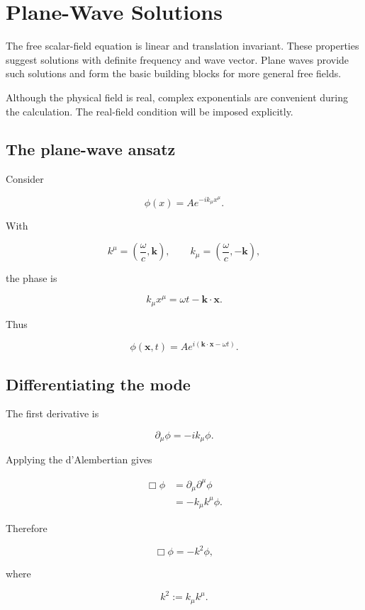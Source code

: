 \section{Plane-Wave Solutions}
\label{sec:plane_wave_solutions}

The free scalar-field equation is linear and translation invariant. These properties suggest solutions with definite frequency and wave vector. Plane waves provide such solutions and form the basic building blocks for more general free fields.

Although the physical field is real, complex exponentials are convenient during the calculation. The real-field condition will be imposed explicitly.

\subsection{The plane-wave ansatz}

Consider

\[
\boxed{
\phi(x)=A e^{-ik_{\mu}x^{\mu}}
}.
\]

With

\[
k^{\mu}
=
\left(
\frac{\omega}{c},
\mathbf{k}
\right),
\qquad
k_{\mu}
=
\left(
\frac{\omega}{c},
-\mathbf{k}
\right),
\]

the phase is

\[
k_{\mu}x^{\mu}
=
\omega t-
\mathbf{k}\cdot\mathbf{x}.
\]

Thus

\[
\phi(\mathbf{x},t)
=
A e^{i(\mathbf{k}\cdot\mathbf{x}-\omega t)}.
\]

\subsection{Differentiating the mode}

The first derivative is

\[
\partial_{\mu}\phi
=
-ik_{\mu}\phi.
\]

Applying the d'Alembertian gives

\[
\begin{aligned}
\Box\phi
&=
\partial_{\mu}\partial^{\mu}\phi\\
&=
-k_{\mu}k^{\mu}\phi.
\end{aligned}
\]

Therefore

\[
\boxed{
\Box\phi=-k^{2}\phi
},
\]

where

\[
k^{2}:=k_{\mu}k^{\mu}.
\]

